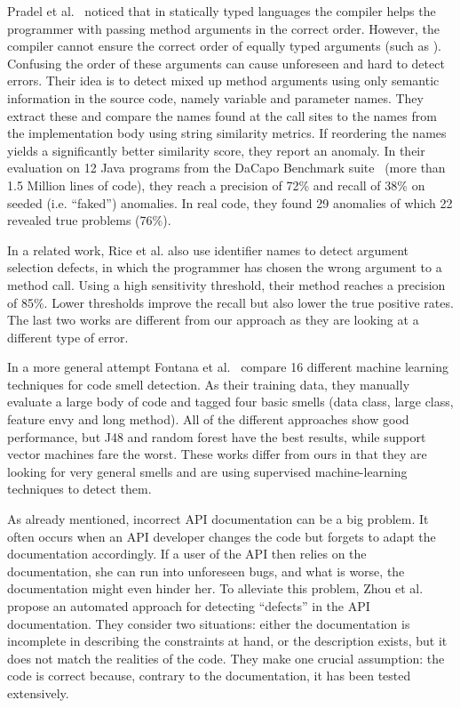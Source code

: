 Pradel et al.~\cite{pradel2011detecting} noticed that in statically typed languages the compiler helps the programmer with passing method arguments in the correct order.
However, the compiler cannot ensure the correct order of equally typed arguments (such as ).
Confusing the order of these arguments can cause unforeseen and hard to detect errors.
Their idea is to detect mixed up method arguments using only semantic information in the source code, namely variable and parameter names.
They extract these and compare the names found at the call sites to the names from the implementation body using string similarity metrics. 
If reordering the names yields a significantly better similarity score, they report an anomaly.
In their evaluation on 12 Java programs from the DaCapo Benchmark suite~\cite{blackburn2006dacapo} (more than 1.5 Million lines of code), they reach a precision of 72\% and recall of 38\% on seeded (i.e. ``faked'') anomalies.
In real code, they found 29 anomalies of which 22 revealed true problems (76\%).

In a related work, Rice et al. \cite{rice2017detecting} also use identifier names to detect argument selection defects, in which the programmer has chosen the wrong argument to a method call.
Using a high sensitivity threshold, their method reaches a precision of 85\%. Lower thresholds improve the recall but also lower the true positive rates.
The last two works are different from our approach as they are looking at a different type of error.

In a more general attempt Fontana et al.~\cite{fontana2013code}\cite{fontana2016comparing} compare 16 different machine learning techniques for code smell detection.
As their training data, they manually evaluate a large body of code and tagged four basic smells (data class, large class, feature envy and long method).
All of the different approaches show good performance, but J48 and random forest have the best results, while support vector machines fare the worst.
These works differ from ours in that they are looking for very general smells and are using supervised machine-learning techniques to detect them.

As already mentioned, incorrect API documentation can be a big problem.
It often occurs when an API developer changes the code but forgets to adapt the documentation accordingly.
If a user of the API then relies on the documentation, she can run into unforeseen bugs, and what is worse, the documentation might even hinder her.
To alleviate this problem, Zhou et al.~\cite{zhou2017analyzing} propose an automated approach for detecting ``defects'' in the API documentation.
They consider two situations: either the documentation is incomplete in describing the constraints at hand, or the description exists, but it does not match the realities of the code.
They make one crucial assumption: the code is correct because, contrary to the documentation, it has been tested extensively.

